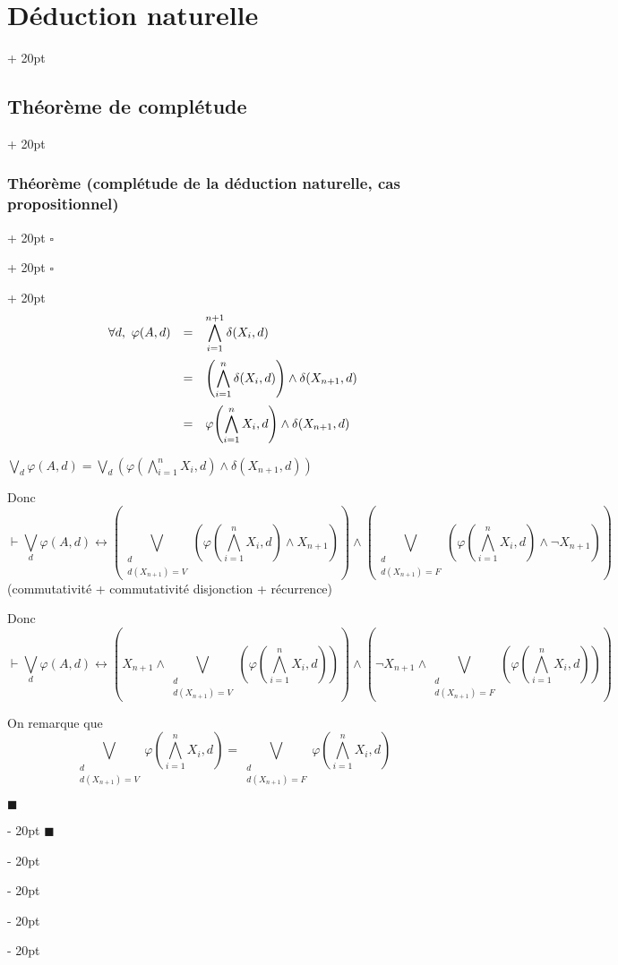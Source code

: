 \documentclass[a4paper, 12pt, twoside]{article}
\newcommand{\lr}[1]{\left( #1 \right)}
\newcommand{\ind}[1][20pt]{\advance\leftskip + #1}
\newcommand{\deind}[1][20pt]{\advance\leftskip - #1}
\newenvironment{indt}[2][20pt]{#2 \par \ind[#1]}{\par \deind} %
\newenvironment{proof}[1][{}]{\begin{indt}{$\square$ #1}}{$\blacksquare$ \end{indt}}
\begin{document}
\begin{indt}{\section{Déduction naturelle}}
\begin{indt}{\subsection{Théorème de complétude}}
\begin{indt}{\subsubsection{Théorème (complétude de la déduction naturelle, cas propositionnel)}}
\begin{proof}
\begin{proof}
                        \[
                            \begin{array}{rcl}
                                \forall d, \ \varphi(A, d)
                                &=& \displaystyle \bigwedge_{i = 1}^{n + 1} \delta(X_i, d)
                                \vspace{6pt}
                                \\
                                &=& \displaystyle
                                \lr{\bigwedge_{i = 1}^n \delta(X_i, d) } \wedge \delta(X_{n + 1}, d)
                                \vspace{6pt}
                                \\
                                &=& \displaystyle
                                \varphi\!\lr{\bigwedge_{i = 1}^n X_i, d} \wedge \delta(X_{n + 1}, d)
                            \end{array}
                        \]

                        $\displaystyle \bigvee_d \varphi(A, d) = \bigvee_d \lr{\varphi\!\lr{\bigwedge_{i = 1}^n X_i, d} \wedge \delta(X_{n + 1}, d)}$

                        Donc
                        \[
                            \vdash \bigvee_d \varphi(A, d)
                            \leftrightarrow
                            \lr{\bigvee_{\substack{d \\ d(X_{n + 1}) = V}} \lr{\varphi\!\lr{\bigwedge_{i = 1}^n X_i, d} \wedge X_{n + 1}}}
                            \wedge
                            \lr{\bigvee_{\substack{d \\ d(X_{n + 1}) = F}} \lr{\varphi\!\lr{\bigwedge_{i = 1}^n X_i, d} \wedge \neg X_{n + 1}}}
                        \]
                        (commutativité + commutativité disjonction + récurrence)

                        Donc
                        \[
                            \vdash \bigvee_d \varphi(A, d)
                            \leftrightarrow
                            \lr{X_{n + 1} \wedge \bigvee_{\substack{d \\ d(X_{n + 1}) = V}} \lr{\varphi\!\lr{\bigwedge_{i = 1}^n X_i, d}}}
                            \wedge
                            \lr{\neg X_{n + 1} \wedge \bigvee_{\substack{d \\ d(X_{n + 1}) = F}} \lr{\varphi\!\lr{\bigwedge_{i = 1}^n X_i, d}}}
                        \]

                        On remarque que
                        \[
                            \bigvee_{\substack{d \\ d(X_{n + 1}) = V}} \varphi\!\lr{\bigwedge_{i = 1}^n X_i, d}
                            =
                            \bigvee_{\substack{d \\ d(X_{n + 1}) = F}} \varphi\!\lr{\bigwedge_{i = 1}^n X_i, d}
                        \]


\end{proof}
\end{proof}
\end{indt}
\end{indt}
\end{indt}
\end{document}
